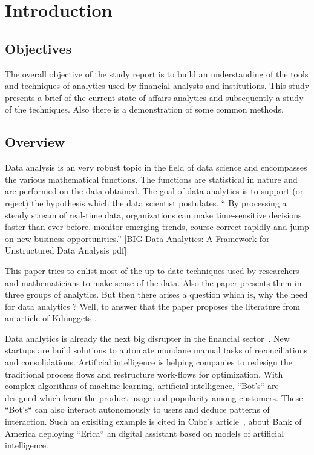 \setlength{\footskip}{8mm}

\chapter{Introduction}

\section{Objectives}

The overall objective of the study report is to build an understanding of the tools and techniques of analytics used by financial analysts and institutions. This study presents a brief of the current state of affairs analytics and subsequently a study of the techniques. Also there is a demonstration of some common methods.


\section{Overview}

Data analysis is an very robust topic in the field of data science and encompasses the various mathematical functions. The functions are statistical in nature and are performed on the data obtained. The goal of data analytics is to support (or reject) the hypothesis which the data scientist postulates.
“ By processing a steady stream of real-time data, organizations can make time-sensitive decisions faster than ever before, monitor emerging trends, course-correct rapidly and jump on new business opportunities.” [BIG Data Analytics: A Framework for Unstructured Data Analysis pdf]

This paper tries to enlist most of the up-to-date techniques used by researchers and mathematicians to make sense of the data. Also the paper presents them in three groups of analytics.
But then there arises a question which is, why the need for data analytics ? Well, to answer that the paper proposes the literature from an article of Kdnuggets .

Data analytics is already the next big disrupter in the financial sector~. New startups are build solutions to automate mundane manual tasks of reconciliations and consolidations. Artificial intelligence is helping companies to redesign the traditional process flows and restructure work-flows for optimization. With complex algorithms of machine learning, artificial intelligence, ``Bot's`` are designed which learn the product usage and popularity among customers. These ``Bot's`` can also interact autonomously to users and deduce patterns of interaction.
Such an exisiting example is cited in Cnbc's article~, about Bank of America deploying ``Erica`` an digital assistant based on models of artificial intelligence.

